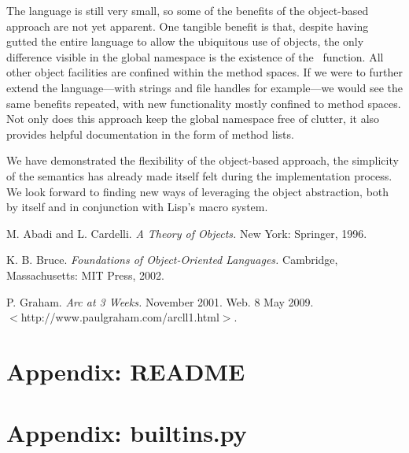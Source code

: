 \documentclass[twocolumn]{article}
\begin{document}
The language is still very small, so some of the benefits of the
object-based approach are not yet apparent. One tangible benefit is
that, despite having gutted the entire language to allow the
ubiquitous use of objects, the only difference visible in the global
namespace is the existence of the \msg\ function. All other object
facilities are confined within the method spaces. If we were to
further extend the language---with strings and file handles for
example---we would see the same benefits repeated, with new
functionality mostly confined to method spaces. Not only does this
approach keep the global namespace free of clutter, it also provides
helpful documentation in the form of method lists.

We have demonstrated the flexibility of the object-based approach, the
simplicity of the semantics has already made itself felt during the
implementation process. We look forward to finding new ways of
leveraging the object abstraction, both by itself and in conjunction
with Lisp's macro system.

\begin{thebibliography}{9}
 M. Abadi and L. Cardelli. \textit{A Theory of Objects.} New
  York: Springer, 1996.

 K. B. Bruce. \textit{Foundations of Object-Oriented
    Languages.} Cambridge, Massachusetts: MIT Press, 2002.

 P. Graham. \textit{Arc at 3 Weeks.} November
  2001. Web. 8 May 2009.\\ $<$http://www.paulgraham.com/arcll1.html$>$.
\end{thebibliography}

\section*{Appendix: README}

\section*{Appendix: builtins.py}
\end{document}
